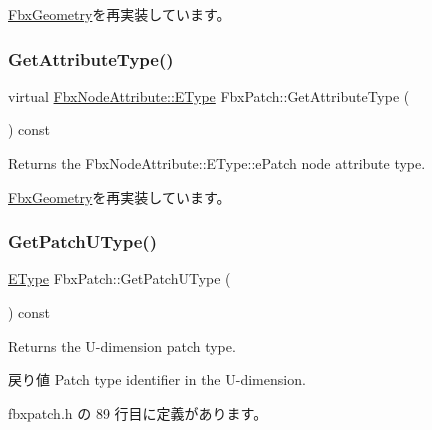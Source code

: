 \hyperlink{class_fbx_geometry_a07e94f7801067d66429afbf1799795cd}{Fbx\+Geometry}を再実装しています。

\mbox{\label{class_fbx_patch_a4eb7de708949e012e0dcae2cb87a2ef4}} 
\subsubsection{\texorpdfstring{Get\+Attribute\+Type()}{GetAttributeType()}}
{\footnotesize\ttfamily virtual \hyperlink{class_fbx_node_attribute_a08e1669d3d1a696910756ab17de56d6a}{Fbx\+Node\+Attribute\+::\+E\+Type} Fbx\+Patch\+::\+Get\+Attribute\+Type (\begin{DoxyParamCaption}{ }\end{DoxyParamCaption}) const\hspace{0.3cm}{\ttfamily [virtual]}}



Returns the Fbx\+Node\+Attribute\+::\+E\+Type\+::e\+Patch node attribute type. 



\hyperlink{class_fbx_geometry_a41ae23e5d0cf08693bca49737f333de9}{Fbx\+Geometry}を再実装しています。

\mbox{\label{class_fbx_patch_ab67355654d2257bffdd2a686b2da4096}} 
\subsubsection{\texorpdfstring{Get\+Patch\+U\+Type()}{GetPatchUType()}}
{\footnotesize\ttfamily \hyperlink{class_fbx_patch_ad669936e6b844a7a15fa30ec7c183fbb}{E\+Type} Fbx\+Patch\+::\+Get\+Patch\+U\+Type (\begin{DoxyParamCaption}{ }\end{DoxyParamCaption}) const\hspace{0.3cm}{\ttfamily [inline]}}

Returns the U-\/dimension patch type. \begin{DoxyReturn}{戻り値}
Patch type identifier in the U-\/dimension. 
\end{DoxyReturn}


 fbxpatch.\+h の 89 行目に定義があります。

